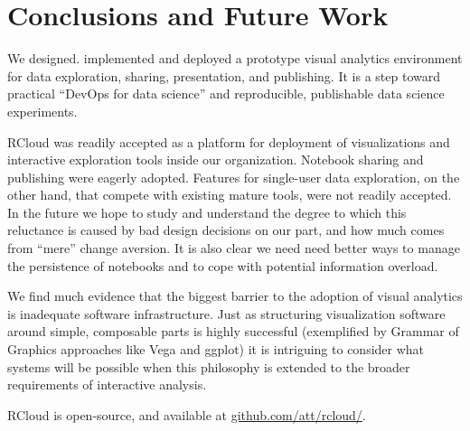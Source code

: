 \section{Conclusions and Future Work}
We designed. implemented and deployed a prototype visual analytics environment
for data exploration, sharing, presentation, and publishing. It is a step toward
practical ``DevOps for data science'' and reproducible, publishable data
science experiments.

RCloud was readily accepted as a platform for deployment of
visualizations and interactive exploration tools inside our organization.  
Notebook sharing and publishing were eagerly adopted.
Features for single-user data exploration, on the other hand, that
compete with existing mature tools, were not readily accepted.
In the future we hope to study and understand the degree to which
this reluctance is caused by bad design decisions on our part, and how
much comes from ``mere'' change aversion. It is also clear we need
need better ways to manage the persistence of notebooks and to cope
with potential information overload.

We find much evidence that the biggest barrier to the adoption of
visual analytics is inadequate software infrastructure.
Just as structuring visualization software around simple,
composable parts is highly successful (exemplified by
Grammar of Graphics approaches like Vega and ggplot)
it is intriguing to consider what systems will be
possible when this philosophy is extended to the
broader requirements of interactive analysis.

RCloud is open-source, and available at \url{github.com/att/rcloud/}.

